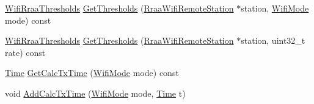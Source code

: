 \begin{DoxyCompactItemize}
\item 
\hyperlink{structns3_1_1WifiRraaThresholds}{Wifi\+Rraa\+Thresholds} \hyperlink{classns3_1_1RraaWifiManager_af3db1ba97d880fcf334499789f309efc}{Get\+Thresholds} (\hyperlink{structns3_1_1RraaWifiRemoteStation}{Rraa\+Wifi\+Remote\+Station} $\ast$station, \hyperlink{classns3_1_1WifiMode}{Wifi\+Mode} mode) const 
\item 
\hyperlink{structns3_1_1WifiRraaThresholds}{Wifi\+Rraa\+Thresholds} \hyperlink{classns3_1_1RraaWifiManager_a438ef27206be459788ab012bc861fc7d}{Get\+Thresholds} (\hyperlink{structns3_1_1RraaWifiRemoteStation}{Rraa\+Wifi\+Remote\+Station} $\ast$station, uint32\+\_\+t rate) const 
\item 
\hyperlink{classns3_1_1Time}{Time} \hyperlink{classns3_1_1RraaWifiManager_aabdab39a21a3e5333dbe38916664326f}{Get\+Calc\+Tx\+Time} (\hyperlink{classns3_1_1WifiMode}{Wifi\+Mode} mode) const 
\item 
void \hyperlink{classns3_1_1RraaWifiManager_a58b7e6351bcffe8729566330a1fca38b}{Add\+Calc\+Tx\+Time} (\hyperlink{classns3_1_1WifiMode}{Wifi\+Mode} mode, \hyperlink{classns3_1_1Time}{Time} t)
\end{DoxyCompactItemize}
